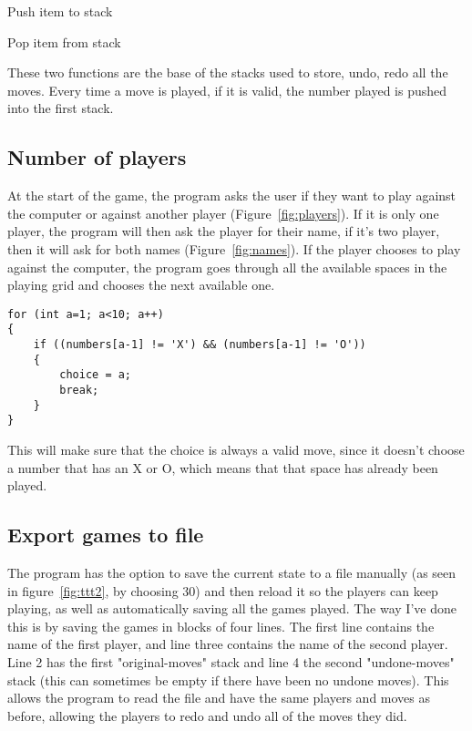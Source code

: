 \documentclass[10pt, a4paper]{article}
\begin{document}
\begin{algorithm}[h]
\caption{Push item to stack}
\end{algorithm}

\begin{algorithm}[h]
\caption{Pop item from stack}
\end{algorithm}


These two functions are the base of the stacks used to store, undo, redo all the moves. Every time a move is played, if it is valid, the number played is pushed into the first stack.

    \subsection{Number of players}

At the start of the game, the program asks the user if they want to play against the computer or against another player (Figure~\ref{fig:players}). If it is only one player, the program will then ask the player for their name, if it's two player, then it will ask for both names (Figure~\ref{fig:names}). If the player chooses to play against the computer, the program goes through all the available spaces in the playing grid and chooses the next available one.

\begin{lstlisting}
for (int a=1; a<10; a++)
{
    if ((numbers[a-1] != 'X') && (numbers[a-1] != 'O'))
    {
        choice = a;
        break;
    }
}
\end{lstlisting}

This will make sure that the choice is always a valid move, since it doesn't choose a number that has an X or O, which means that that space has already been played.

    \subsection{Export games to file}

The program has the option to save the current state to a file manually (as seen in figure~\ref{fig:ttt2}, by choosing 30) and then reload it so the players can keep playing, as well as automatically saving all the games played. The way I've done this is by saving the games in blocks of four lines. The first line contains the name of the first player, and line three contains the name of the second player. Line 2 has the first "original-moves" stack and line 4 the second "undone-moves" stack (this can sometimes be empty if there have been no undone moves). This allows the program to read the file and have the same players and moves as before, allowing the players to redo and undo all of the moves they did.
\end{document}

